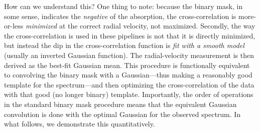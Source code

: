 \documentclass[modern]{aastex631}
\begin{document}
How can we understand this?
One thing to note: because the binary mask, in some sense, indicates the \emph{negative} of the absorption, the cross-correlation is more-or-less \emph{minimized} at the correct radial velocity, not maximized.
Secondly, the way the cross-correlation is used in these pipelines is not that it is directly minimized, but instead the dip in the cross-correlation function is \emph{fit with a smooth model} (usually an inverted Gaussian function).
The radial-velocity measurement is then derived as the best-fit Gaussian mean.
This procedure is functionally equivalent to convolving the binary mask with a Gaussian---thus making a reasonably good template for the spectrum---and then optimizing the cross-correlation of the data with that good (no longer binary) template. 
Importantly, the order of operations in the standard binary mask procedure means that the equivalent Gaussian convolution is done with the optimal Gaussian for the observed spectrum.
In what follows, we demonstrate this quantitatively.
\end{document}
